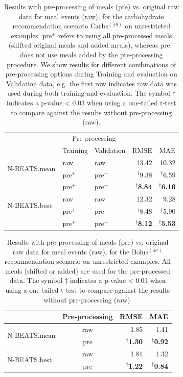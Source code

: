 \documentclass[journal,article,submit,moreauthors,pdftex]{Definitions/mdpi}
\begin{document}
\begin{table}[ht]
\setlength{\tabcolsep}{4pt}
\caption{Results with pre-processing of meals (pre) vs. original raw data for meal events (raw), for the carbohydrate recommendation scenario Carbs$^{(\pm b)}$ on unrestricted examples. pre$^+$ refers to using all pre-processed meals (shifted original meals and added meals), whereas pre$^-$ does not use meals added by the pre-processing procedure. We show results for different combinations of pre-processing options during Training and evaluation on Validation data, e.g. the first row indicates raw data was used during both training and evaluation. The symbol $\dagger$ indicates a p-value < 0.03 when using a one-tailed t-test to compare against the results without pre-processing (raw).}
\begin{center}
\label{tab:pre-carbs}
\begin{tabular}{|l|ll|rr|}
    \cline{2-3}
    \multicolumn{1}{c|}{} & \multicolumn{2}{c|}{Pre-processing} &  \multicolumn{2}{c}{} \\
    \cline{2-5}
	\multicolumn{1}{c|}{} & Training & Validation & RMSE & MAE\\
    \hline
    \multirow{2}{*}{N-BEATS.mean} & raw & raw & 13.42 & 10.32\\
	& pre$^+$ & pre$^-$ & $^\dagger$9.38 & $^\dagger$6.59\\
	& pre$^+$ & pre$^+$ & $^\dagger${\bf 8.84} & $^\dagger${\bf 6.16}\\
    \hline
    \multirow{2}{*}{N-BEATS.best} & raw & raw & 12.32 & 9.28\\
    & pre$^+$ & pre$^-$ & $^\dagger$8.48 & $^\dagger$5.90\\
    & pre$^+$ & pre$^+$ & $^\dagger${\bf 8.12} & $^\dagger${\bf 5.53}\\
    \hline
\end{tabular}
\end{center}
\end{table}

\begin{table}[ht]
\setlength{\tabcolsep}{4pt}
\caption{Results with pre-processing of meals (pre) vs. original raw data for meal events (raw), for the Bolus$^{(\pm c)}$ recommendation scenario on unrestricted examples. All meals (shifted or added) are used for the pre-processed data. The symbol $\dagger$ indicates a p-value < 0.01 when using a one-tailed t-test to compare against the results without pre-processing (raw).}
\begin{center}
\label{tab:pre-bolus}
\begin{tabular}{|l|c|rr|}
    \cline{2-4}
	\multicolumn{1}{c|}{} & Pre-processing & RMSE & MAE\\
    \hline
    \multirow{2}{*}{N-BEATS.mean} & raw & 1.85 & 1.41\\
    & pre & $^\dagger${\bf 1.30} & $^\dagger${\bf 0.92}\\
    \hline
    \multirow{2}{*}{N-BEATS.best} & raw & 1.81 & 1.32 \\
    & pre & $^\dagger${\bf 1.22} & $^\dagger${\bf 0.84}\\
    \hline
\end{tabular}
\end{center}
\end{table}
\end{document}
